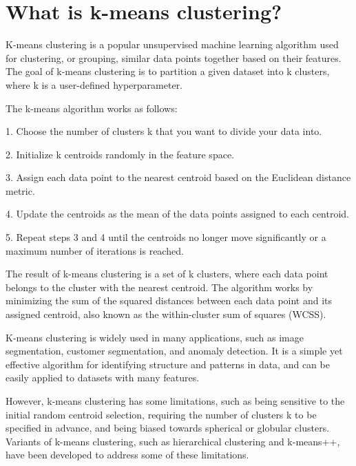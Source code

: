 \section{What is k-means clustering?}
K-means clustering is a popular unsupervised machine learning algorithm used for clustering, or grouping, similar data points together based on their features. The goal of k-means clustering is to partition a given dataset into k clusters, where k is a user-defined hyperparameter.

The k-means algorithm works as follows:

1. Choose the number of clusters k that you want to divide your data into.

2. Initialize k centroids randomly in the feature space.

3. Assign each data point to the nearest centroid based on the Euclidean distance metric.

4. Update the centroids as the mean of the data points assigned to each centroid.

5. Repeat steps 3 and 4 until the centroids no longer move significantly or a maximum number of iterations is reached.

The result of k-means clustering is a set of k clusters, where each data point belongs to the cluster with the nearest centroid. The algorithm works by minimizing the sum of the squared distances between each data point and its assigned centroid, also known as the within-cluster sum of squares (WCSS).

K-means clustering is widely used in many applications, such as image segmentation, customer segmentation, and anomaly detection. It is a simple yet effective algorithm for identifying structure and patterns in data, and can be easily applied to datasets with many features.

However, k-means clustering has some limitations, such as being sensitive to the initial random centroid selection, requiring the number of clusters k to be specified in advance, and being biased towards spherical or globular clusters. Variants of k-means clustering, such as hierarchical clustering and k-means++, have been developed to address some of these limitations.

